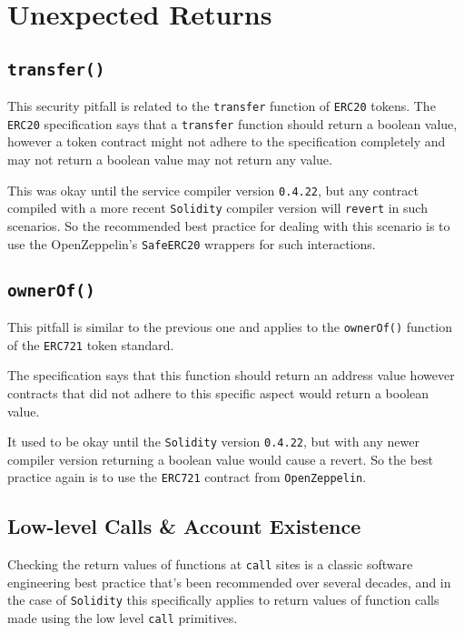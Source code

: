 \section{Unexpected Returns}\label{unexpected-returns}

\subsection{\texorpdfstring{\texttt{transfer()}}{transfer()}}\label{transfer}

This security pitfall is related to the \texttt{transfer} function of
\texttt{ERC20} tokens. The \texttt{ERC20} specification says that a
\texttt{transfer} function should return a boolean value, however a
token contract might not adhere to the specification completely and may
not return a boolean value may not return any value.

This was okay until the service compiler version \texttt{0.4.22}, but
any contract compiled with a more recent \texttt{Solidity} compiler
version will \texttt{revert} in such scenarios. So the recommended best
practice for dealing with this scenario is to use the OpenZeppelin's
\texttt{SafeERC20} wrappers for such interactions.

\subsection{\texorpdfstring{\texttt{ownerOf()}}{ownerOf()}}\label{ownerof}

This pitfall is similar to the previous one and applies to the
\texttt{ownerOf()} function of the \texttt{ERC721} token standard.

The specification says that this function should return an address value
however contracts that did not adhere to this specific aspect would
return a boolean value.

It used to be okay until the \texttt{Solidity} version \texttt{0.4.22},
but with any newer compiler version returning a boolean value would
cause a revert. So the best practice again is to use the \texttt{ERC721}
contract from \texttt{OpenZeppelin}.

\subsection{Low-level Calls \& Account
Existence}\label{low-level-calls-account-existence}

Checking the return values of functions at \texttt{call} sites is a
classic software engineering best practice that's been recommended over
several decades, and in the case of \texttt{Solidity} this specifically
applies to return values of function calls made using the low level
\texttt{call} primitives.

